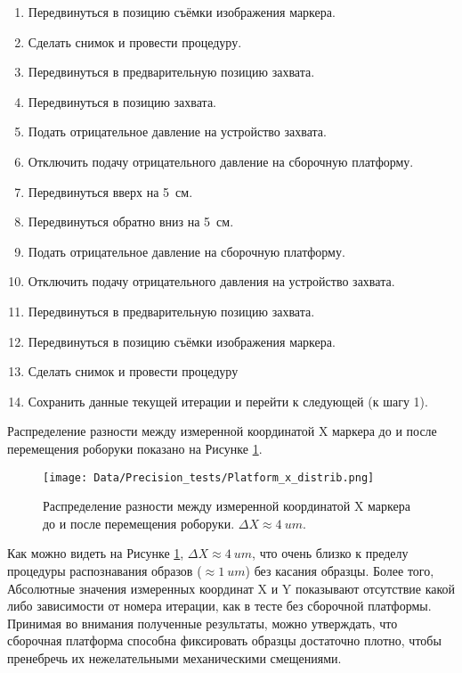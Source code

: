 \begin{enumerate}
\setlength\itemsep{-0.5em}
\item Передвинуться в позицию съёмки изображения маркера.
\item Сделать снимок и провести процедуру.
\item Передвинуться в предварительную позицию захвата.
\item Передвинуться в позицию захвата.
\item Подать отрицательное давление на устройство захвата.
\item Отключить подачу отрицательного давление на сборочную платформу.
\item Передвинуться вверх на 5~см.
\item Передвинуться обратно вниз на 5~см.
\item Подать отрицательное давление на сборочную платформу.
\item Отключить подачу отрицательного давления на устройство захвата.
\item Передвинуться в предварительную позицию захвата.
\item Передвинуться в позицию съёмки изображения маркера.
\item Сделать снимок и провести процедуру
\item Сохранить данные текущей итерации и перейти к следующей (к шагу 1).
\end{enumerate}

Распределение разности между измеренной координатой X маркера до и после перемещения роборуки показано на Рисунке \ref{fig:platform_distribution}.

\begin{figure}[ht]\centering
\texttt{[image: Data/Precision\_tests/Platform\_x\_distrib.png]}
\caption{Распределение разности между измеренной координатой X маркера до и после перемещения роборуки. $\Delta X \approx 4~um$. }
\label{fig:platform_distribution}
\end{figure}

Как можно видеть на Рисунке \ref{fig:platform_distribution}, $\Delta X \approx 4~um$, что очень близко к пределу процедуры распознавания образов ($\approx 1~um$) без касания образцы. Более того, Абсолютные значения измеренных координат X и Y показывают отсутствие какой либо зависимости от номера итерации, как в тесте без сборочной платформы. Принимая во внимания полученные результаты, можно утверждать, что сборочная платформа способна фиксировать образцы достаточно плотно, чтобы пренебречь их нежелательными механическими смещениями.

